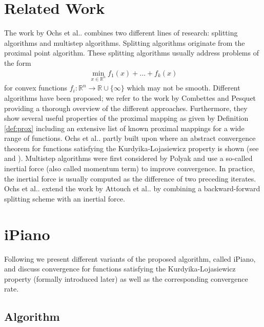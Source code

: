 \documentclass[onecolumn,final,a4paper,13pt,reqno]{siamart}
\makeatletter
\DeclareRobustCommand\onedot{\futurelet\@let@token\@onedot}
\def\@onedot{\ifx\@let@token.\else.\null\fi\xspace}
\def\etal{{et al}\onedot}
\makeatother
\begin{document}
\section{Related Work}
\label{sec:related-work}

The work by Ochs \etal combines two different lines of research: splitting algorithms and multistep algorithms. Splitting algorithms originate from the proximal point algorithm. These splitting algorithms usually address problems of the form
\begin{align}
	\min_{x \in \mathbb{R}^n} f_1(x) + \ldots + f_k(x)
\end{align}
for convex functions $f_i : \mathbb{R}^n \rightarrow \mathbb{R} \cup \{\infty\}$ which may not be smooth. Different algorithms have been proposed; we refer to the work by Combettes and Pesquet \cite{CombettesPesquet:2011} providing a thorough overview of the different approaches. Furthermore, they show several useful properties of the proximal mapping as given by Definition \ref{def:prox} including an extensive list of known proximal mappings for a wide range of functions. Ochs \etal partly built upon \cite{AttouchBolteSvaiter:2013} where an abstract convergence theorem for functions satisfying the Kurdyika-Lojasiewicz property is shown (see \cite{Lojasiewicz:1993} and \cite{Kurdyka:1998}). Multistep algorithms were first considered by Polyak \cite{Polyak:1964} and use a so-called inertial force (also called momentum term) to improve convergence. In practice, the inertial force is usually computed as the difference of two preceding iterates. Ochs \etal extend the work by Attouch \etal \cite{AttouchBolteSvaiter:2013} by combining a backward-forward splitting scheme with an inertial force.

\section{iPiano}
\label{sec:ipiano}

Following \cite{OchsChenBroxPock:2013} we present different variants of the proposed algorithm, called iPiano, and discuss convergence for functions satisfying the Kurdyika-Lojasiewicz property (formally introduced later) as well as the corresponding convergence rate.

\subsection{Algorithm}
\label{subsec:ipiano-algorithm}
\end{document}
